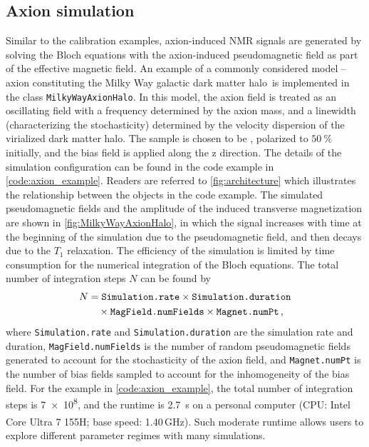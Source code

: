 \documentclass[universe,article,submit,oneauthor]{Definitions/mdpi}
\begin{document}
\subsection{Axion simulation}
\label{sec:simulation}

Similar to the calibration examples, axion-induced NMR signals are generated by solving the Bloch equations with the axion-induced pseudomagnetic field as part of the effective magnetic field. 
An example of a commonly considered model -- axion constituting the Milky Way galactic dark matter halo\,\cite{Evans2019_SHMRefined,Gramolin2022Feb_SpectralSignatures} is implemented in the class \texttt{MilkyWayAxionHalo}. 
In this model, the axion field is treated as an oscillating field with a frequency determined by the axion mass, and a linewidth (characterizing the stochasticity) determined by the velocity dispersion of the virialized dark matter halo. 
The sample is chosen to be , polarized to $\SI{50}{\%}$ initially, and the bias field is applied along the z direction. 
The details of the simulation configuration can be found in the code example in \cref{code:axion_example}. 
Readers are referred to \cref{fig:architecture} which illustrates the relationship between the objects in the code example. 
The simulated pseudomagnetic fields and the amplitude of the induced transverse magnetization are shown in \cref{fig:MilkyWayAxionHalo}, in which the signal increases with time at the beginning of the simulation due to the pseudomagnetic field, and then decays due to the $T_1$ relaxation. 
The efficiency of the simulation is limited by time consumption for the numerical integration of the Bloch equations. 
The total number of integration steps $N$ can be found by
\begin{align}
    N &= \text{\texttt{Simulation.rate}} \times \text{\texttt{Simulation.duration}} \nonumber\\
    &\quad \times \text{\texttt{MagField.numFields}} \times \text{\texttt{Magnet.numPt}}\,,
\end{align}
where \texttt{Simulation.rate} and \texttt{Simulation.duration} are the simulation rate and duration, \texttt{MagField.numFields} is the number of random pseudomagnetic fields generated to account for the stochasticity of the axion field, and \texttt{Magnet.numPt} is the number of bias fields sampled to account for the inhomogeneity of the bias field.
For the example in \cref{code:axion_example}, the total number of integration steps is \SI{7e8}{}, and the runtime is \SI{2.7}{\s} on a personal computer (CPU: Intel\textsuperscript{\textregistered} Core\textsuperscript{\texttrademark} Ultra 7 155H; base speed: 1.40\,GHz). 
Such moderate runtime allows users to explore different parameter regimes with many simulations. 
\end{document}
